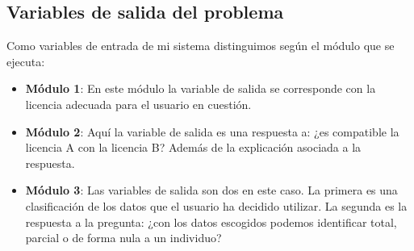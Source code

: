 \subsection{Variables de salida del problema}

Como variables de entrada de mi sistema distinguimos según el módulo que se ejecuta:
\begin{itemize}
	\item \textbf{Módulo 1}: En este módulo la variable de salida se corresponde con la licencia adecuada para el usuario en cuestión.
	\item \textbf{Módulo 2}: Aquí la variable de salida es una respuesta a: ¿es compatible la licencia A con la licencia B? Además de la explicación asociada a la respuesta.
	\item \textbf{Módulo 3}: Las variables de salida son dos en este caso. La primera es una clasificación de los datos que el usuario ha decidido utilizar.
	La segunda es la respuesta a la pregunta: ¿con los datos escogidos podemos identificar total, parcial o de forma nula a un individuo?
\end{itemize}

\newpage

